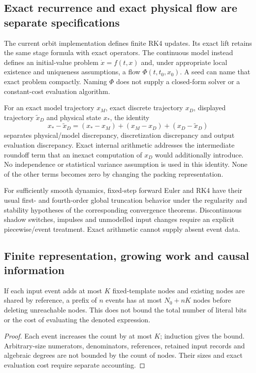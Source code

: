 \subsection{Exact recurrence and exact physical flow are separate specifications}
The current orbit implementation defines finite RK4 updates. Its exact lift
retains the same stage formula with exact operators. The continuous model instead
defines an initial-value problem $\dot x=f(t,x)$ and, under appropriate local
existence and uniqueness assumptions, a flow $\Phi(t,t_0,x_0)$. A seed can name
that exact problem compactly. Naming $\Phi$ does not supply a closed-form solver
or a constant-cost evaluation algorithm.

For an exact model trajectory $x_M$, exact discrete trajectory $x_D$, displayed
trajectory $\widetilde x_D$ and physical state $x_*$, the identity
\[
 x_*-\widetilde x_D=(x_*-x_M)+(x_M-x_D)+(x_D-\widetilde x_D)
\]
separates physical/model discrepancy, discretization discrepancy and output
evaluation discrepancy. Exact internal arithmetic addresses the intermediate
roundoff term that an inexact computation of $x_D$ would additionally introduce.
No independence or statistical variance assumption is used in this identity.
None of the other terms becomes zero by changing the packing representation.

For sufficiently smooth dynamics, fixed-step forward Euler and RK4 have their
usual first- and fourth-order global truncation behavior under the regularity and
stability hypotheses of the corresponding convergence theorems. Discontinuous
shadow switches, impulses and unmodelled input changes require an explicit
piecewise/event treatment. Exact arithmetic cannot supply absent event data.

\subsection{Finite representation, growing work and causal information}
\begin{proposition}
If each input event adds at most $K$ fixed-template nodes and existing nodes are
shared by reference, a prefix of $n$ events has at most $N_0+nK$ nodes before
deleting unreachable nodes. This does not bound the total number of literal bits
or the cost of evaluating the denoted expression.
\end{proposition}
\begin{proof}
Each event increases the count by at most $K$; induction gives the bound.
Arbitrary-size numerators, denominators, references, retained input records and
algebraic degrees are not bounded by the count of nodes. Their sizes and exact
evaluation cost require separate accounting.
\end{proof}

